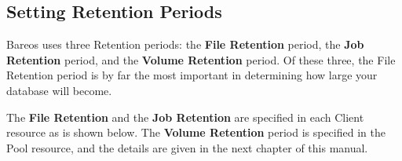 \subsection{Setting Retention Periods}
\label{Retention}

Bareos uses three Retention periods: the {\bf File Retention} period,
the {\bf Job Retention} period, and the {\bf Volume Retention} period. Of
these three, the File Retention period is by far the most important in
determining how large your database will become.

The {\bf File Retention} and the {\bf Job Retention} are specified in each
Client resource as is shown below. The {\bf Volume Retention} period is
specified in the Pool resource, and the details are given in the next chapter
of this manual.

